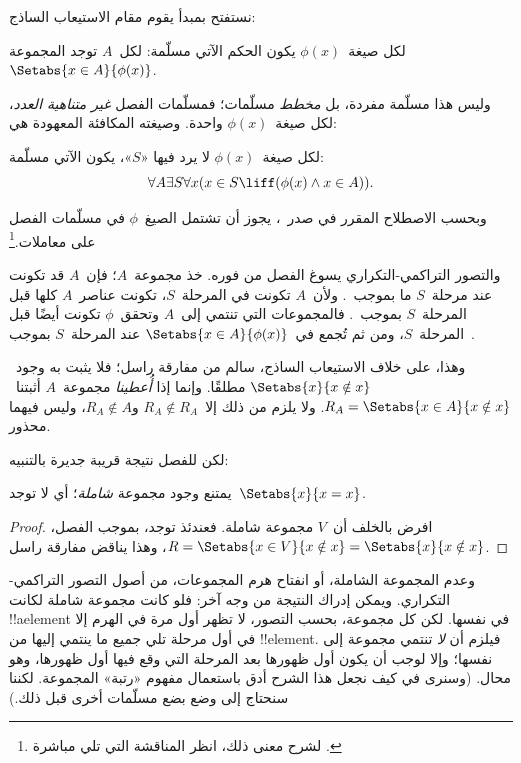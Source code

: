 \documentclass[../../../include/open-logic-section]{subfiles}
\begin{document}

نستفتح بمبدأ يقوم مقام الاستيعاب الساذج:

\begin{axiom} لكل صيغة~$\phi(x)$ يكون الحكم الآتي مسلّمة:
لكل~$A$ توجد المجموعة~$\Setabs{x \in A}{\phi(x)}$.
\end{axiom}

وليس هذا مسلّمة مفردة، بل \emph{مخطط} مسلّمات؛ فمسلّمات الفصل
\emph{غير متناهية العدد}، لكل صيغة~$\phi(x)$ واحدة. وصيغته المكافئة
المعهودة هي:

\begin{defish}
لكل صيغة~$\phi(x)$ لا يرد فيها «$S$»، يكون الآتي مسلّمة:
\[
	\forall A \exists S \forall x(x \in S \liff (\phi(x) \land x \in A)).
\]
\end{defish}

وبحسب الاصطلاح المقرر في صدر~، يجوز أن تشتمل
الصيغ~$\phi$ في مسلّمات الفصل على معاملات.\footnote{لشرح معنى ذلك،
  انظر المناقشة التي تلي مباشرة
  .}

والتصور التراكمي-التكراري يسوغ الفصل من فوره. خذ مجموعة~$A$؛ فإن~$A$
قد تكونت عند مرحلة~$S$ ما بموجب~\stageshier. ولأن~$A$ تكونت في
المرحلة~$S$، تكونت عناصر~$A$ كلها قبل المرحلة~$S$ بموجب~\stagesacc.
فالمجموعات التي تنتمي إلى~$A$ وتحقق~$\phi$ تكونت أيضًا قبل
المرحلة~$S$، ومن ثم تُجمع في~$\Setabs{x \in A}{\phi(x)}$ عند
المرحلة~$S$ بموجب~\stagesacc.

وهذا، على خلاف الاستيعاب الساذج، سالم من مفارقة راسل؛ فلا يثبت به
وجود~$\Setabs{x}{x \notin x}$ مطلقًا. وإنما إذا \emph{أُعطينا}
مجموعة~$A$ أثبتنا~$R_A = \Setabs{x \in A}{x \notin x}$. ولا يلزم
من ذلك إلا~$R_A \notin R_A$ و$R_A \notin A$، وليس فيهما محذور.

لكن للفصل نتيجة قريبة جديرة بالتنبيه:

\begin{thm}
يمتنع وجود مجموعة \emph{شاملة}؛ أي لا توجد~$\Setabs{x}{x = x}$.
\end{thm}

\begin{proof}
افرض بالخلف أن~$V$ مجموعة شاملة. فعندئذ توجد، بموجب الفصل،
$R = \Setabs{x \in V}{x \notin x} = \Setabs{x}{x \notin x}$،
وهذا يناقض مفارقة راسل.
\end{proof}

وعدم المجموعة الشاملة، أو انفتاح هرم المجموعات، من أصول التصور
التراكمي-التكراري. ويمكن إدراك النتيجة من وجه آخر: فلو كانت مجموعة
شاملة لكانت !!a{element} في نفسها. لكن كل مجموعة، بحسب التصور، لا تظهر
أول مرة في الهرم إلا في أول مرحلة تلي جميع ما ينتمي إليها من
!!{element}. فيلزم أن \emph{لا} تنتمي مجموعة إلى نفسها؛ وإلا لوجب أن
يكون أول ظهورها بعد المرحلة التي وقع فيها أول ظهورها، وهو محال. (وسنرى
في
 كيف نجعل هذا الشرح أدق باستعمال
مفهوم «رتبة» المجموعة. لكننا سنحتاج إلى وضع بضع مسلّمات أخرى قبل ذلك.)
\end{document}
